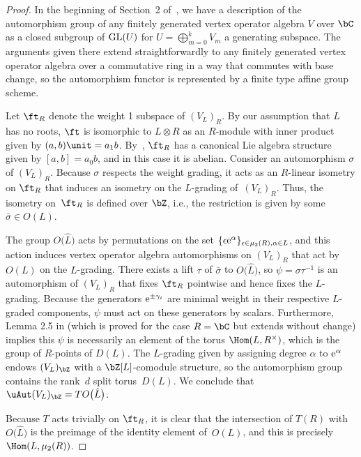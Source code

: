 \begin{proof}In the beginning of Section~2 of~\cite{DG01}, we have a description of the automorphism group of any finitely generated vertex operator algebra $V$ over $\bC$ as a closed subgroup of ${\rm GL}(U)$ for $U = \bigoplus_{m=0}^k V_m$ a generating subspace. The arguments given there extend straightforwardly to any finitely generated vertex operator algebra over a commutative ring in a way that commutes with base change, so the automorphism functor is represented by a finite type affine group scheme.

Let $\ft_R$ denote the weight 1 subspace of $(V_L)_R$. By our assumption that $L$ has no roots, $\ft$ is isomorphic to $L \otimes R$ as an $R$-module with inner product given by $(a,b)\unit = a_1 b$. By~\cite{B86}, $\ft_R$ has a canonical Lie algebra structure given by $[a,b] = a_0 b$, and in this case it is abelian. Consider an automorphism $\sigma$ of $(V_L)_R$. Because $\sigma$ respects the weight grading, it acts as an $R$-linear isometry on $\ft_R$ that induces an isometry on the $L$-grading of~$(V_L)_R$. Thus, the isometry on~$\ft_R$ is defined over $\bZ$, i.e., the restriction is given by some $\bar{\sigma} \in O(L)$.

The group $O\big(\hat{L}\big)$ acts by permutations on the set $\{ \epsilon {\rm e}^\alpha \}_{\epsilon \in \mu_2(R), \alpha \in L}$, and this action induces vertex operator algebra automorphisms on $(V_L)_R$ that act by $O(L)$ on the $L$-grading. There exists a lift $\tau$ of $\bar{\sigma}$ to $O\big(\hat{L}\big)$, so $\psi = \sigma \tau^{-1}$ is an automorphism of $(V_L)_R$ that fixes $\ft_R$ pointwise and hence fixes the $L$-grading. Because the generators ${\rm e}^{\pm \gamma_i}$ are minimal weight in their respective $L$-graded components, $\psi$ must act on these generators by scalars. Furthermore, Lemma 2.5 in \cite{DN98} (which is proved for the case $R = \bC$ but extends without change) implies this $\psi$ is necessarily an element of the torus $\Hom(L, R^\times)$, which is the group of $R$-points of $D(L)$. The $L$-grading given by assigning degree $\alpha$ to ${\rm e}^\alpha$ endows $(V_L)_\bZ$ with a $\bZ[L]$-comodule structure, so the automorphism group contains the rank~$d$ split torus~$D(L)$. We conclude that $\uAut(V_L)_\bZ = T O\big(\hat{L}\big)$.

Because $T$ acts trivially on $\ft_R$, it is clear that the intersection of $T(R)$ with $O\big(\hat{L}\big)$ is the preimage of the identity element of~$O(L)$, and this is precisely $\Hom(L,\mu_2(R))$.
\end{proof}

